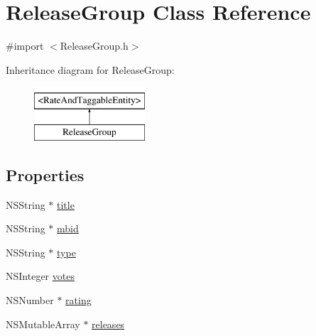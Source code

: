 \hypertarget{interface_release_group}{\section{Release\-Group Class Reference}
\label{interface_release_group}
}


{\ttfamily \#import $<$Release\-Group.\-h$>$}

Inheritance diagram for Release\-Group\-:\begin{figure}[H]
\begin{center}
\leavevmode
\includegraphics[height=2.000000cm]{interface_release_group}
\end{center}
\end{figure}
\subsection*{Properties}
\begin{DoxyCompactItemize}
\item 
N\-S\-String $\ast$ \hyperlink{interface_release_group_ae60eb2e0b0f4bedbfbf9231bce498524}{title}
\item 
N\-S\-String $\ast$ \hyperlink{interface_release_group_a4a84034b8b258d2f06689f46db33bd84}{mbid}
\item 
N\-S\-String $\ast$ \hyperlink{interface_release_group_a79e0fe8a13b16cdad084603084092076}{type}
\item 
N\-S\-Integer \hyperlink{interface_release_group_a12ad0c50a63cf6bdd3469f775aef06cb}{votes}
\item 
N\-S\-Number $\ast$ \hyperlink{interface_release_group_aef91f8eab4a7f8a7f301530a8eb1af1a}{rating}
\item 
N\-S\-Mutable\-Array $\ast$ \hyperlink{interface_release_group_adba41e812d2c11c5ab74f24888cfb157}{releases}
\end{DoxyCompactItemize}


